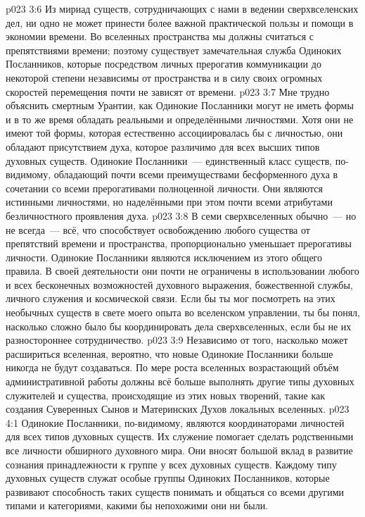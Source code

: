 \vs p023 3:6 Из мириад существ, сотрудничающих с нами в ведении сверхвселенских дел, ни одно не может принести более важной практической пользы и помощи в экономии времени. Во вселенных пространства мы должны считаться с препятствиями времени; поэтому существует замечательная служба Одиноких Посланников, которые посредством личных прерогатив коммуникации до некоторой степени независимы от пространства и в силу своих огромных скоростей перемещения почти не зависят от времени.
\vs p023 3:7 \pc Мне трудно объяснить смертным Урантии, как Одинокие Посланники могут не иметь формы и в то же время обладать реальными и определёнными личностями. Хотя они не имеют той формы, которая естественно ассоциировалась бы с личностью, они обладают присутствием духа, которое различимо для всех высших типов духовных существ. Одинокие Посланники~--- единственный класс существ, по\hyp{}видимому, обладающий почти всеми преимуществами бесформенного духа в сочетании со всеми прерогативами полноценной личности. Они являются истинными личностями, но наделёнными при этом почти всеми атрибутами безличностного проявления духа.
\vs p023 3:8 В семи сверхвселенных обычно~--- но не всегда~--- всё, что способствует освобождению любого существа от препятствий времени и пространства, пропорционально уменьшает прерогативы личности. Одинокие Посланники являются исключением из этого общего правила. В своей деятельности они почти не ограничены в использовании любого и всех бесконечных возможностей духовного выражения, божественной службы, личного служения и космической связи. Если бы ты мог посмотреть на этих необычных существ в свете моего опыта во вселенском управлении, ты бы понял, насколько сложно было бы координировать дела сверхвселенных, если бы не их разностороннее сотрудничество.
\vs p023 3:9 Независимо от того, насколько может расшириться вселенная, вероятно, что новые Одинокие Посланники больше никогда не будут создаваться. По мере роста вселенных возрастающий объём административной работы должны всё больше выполнять другие типы духовных служителей и существа, происходящие из этих новых творений, такие как создания Суверенных Сынов и Материнских Духов локальных вселенных.
\vs p023 4:1 Одинокие Посланники, по\hyp{}видимому, являются координаторами личностей для всех типов духовных существ. Их служение помогает сделать родственными все личности обширного духовного мира. Они вносят большой вклад в развитие сознания принадлежности к группе у всех духовных существ. Каждому типу духовных существ служат особые группы Одиноких Посланников, которые развивают способность таких существ понимать и общаться со всеми другими типами и категориями, какими бы непохожими они ни были.
